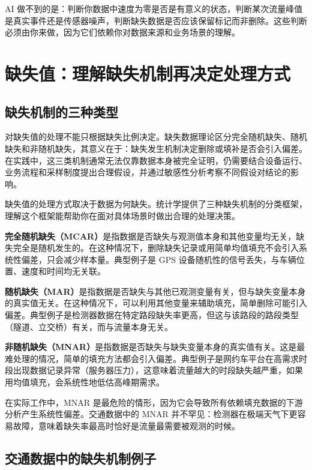 AI 做不到的是：判断你数据中速度为零是否是有意义的状态，判断某次流量峰值是真实事件还是传感器噪声，判断缺失数据是否应该保留标记而非删除。这些判断必须由你来做，因为它们依赖你对数据来源和业务场景的理解。

\section{缺失值：理解缺失机制再决定处理方式}

\subsection{缺失机制的三种类型}

对缺失值的处理不能只根据缺失比例决定。缺失数据理论区分完全随机缺失、随机缺失和非随机缺失，其意义在于：缺失发生机制决定删除或填补是否会引入偏差\cite{little2019statistical}。在实践中，这三类机制通常无法仅靠数据本身被完全证明，仍需要结合设备运行、业务流程和采样制度提出合理假设，并通过敏感性分析考察不同假设对结论的影响。

缺失值的处理方式取决于数据为何缺失。统计学提供了三种缺失机制的分类框架，理解这个框架能帮助你在面对具体场景时做出合理的处理决策。

\textbf{完全随机缺失（MCAR）}是指数据是否缺失与观测值本身和其他变量均无关，缺失完全是随机发生的。在这种情况下，删除缺失记录或用简单均值填充不会引入系统性偏差，只会减少样本量。典型例子是 GPS 设备随机性的信号丢失，与车辆位置、速度和时间均无关联。

\textbf{随机缺失（MAR）}是指数据是否缺失与其他已观测变量有关，但与缺失变量本身的真实值无关。在这种情况下，可以利用其他变量来辅助填充，简单删除可能引入偏差。典型例子是检测器数据在特定路段缺失率更高，但这与该路段的路段类型（隧道、立交桥）有关，而与流量本身无关。

\textbf{非随机缺失（MNAR）}是指数据是否缺失与缺失变量本身的真实值有关。这是最难处理的情况，简单的填充方法都会引入偏差。典型例子是网约车平台在高需求时段出现数据记录异常（服务器压力），这意味着流量越大的时段缺失越严重，如果用均值填充，会系统性地低估高峰期需求。

在实际工作中，MNAR 是最危险的情形，因为它会导致所有依赖填充数据的下游分析产生系统性偏差。交通数据中的 MNAR 并不罕见：检测器在极端天气下更容易故障，意味着缺失率最高时恰好是流量最需要被观测的时候。

\subsection{交通数据中的缺失机制例子}

